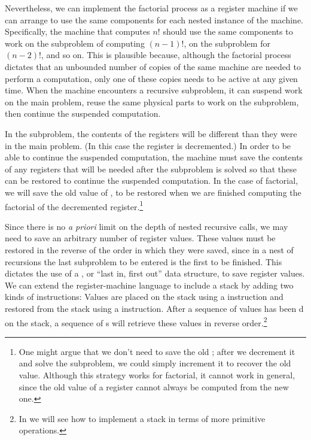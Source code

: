 Nevertheless, we can implement the factorial process as a register machine if
we can arrange to use the same components for each nested instance of the
machine.  Specifically, the machine that computes \( n! \)  should use the same
components to work on the subproblem of computing \( (n - 1)! \), on the
subproblem for \( (n - 2)! \), and so on.  This is plausible because, although
the factorial process dictates that an unbounded number of copies of the same
machine are needed to perform a computation, only one of these copies needs to
be active at any given time.  When the machine encounters a recursive
subproblem, it can suspend work on the main problem, reuse the same physical
parts to work on the subproblem, then continue the suspended computation.

In the subproblem, the contents of the registers will be different than they
were in the main problem. (In this case the  register is decremented.)
In order to be able to continue the suspended computation, the machine must
save the contents of any registers that will be needed after the subproblem is
solved so that these can be restored to continue the suspended computation.  In
the case of factorial, we will save the old value of , to be restored
when we are finished computing the factorial of the decremented 
register.\footnote{One might argue that we don't need to save the old ;
after we decrement it and solve the subproblem, we could simply increment it to
recover the old value.  Although this strategy works for factorial, it cannot
work in general, since the old value of a register cannot always be computed
from the new one.}

Since there is no \emph{a priori} limit on the depth of nested recursive calls,
we may need to save an arbitrary number of register values.  These values must
be restored in the reverse of the order in which they were saved, since in a
nest of recursions the last subproblem to be entered is the first to be
finished.  This dictates the use of a , or ``last in, first
out'' data structure, to save register values.  We can extend the
register-machine language to include a stack by adding two kinds of
instructions: Values are placed on the stack using a  instruction
and restored from the stack using a  instruction.  After a
sequence of values has been d on the stack, a sequence of
s will retrieve these values in reverse order.\footnote{In
 we will see how to implement a stack in terms of more
primitive operations.}

